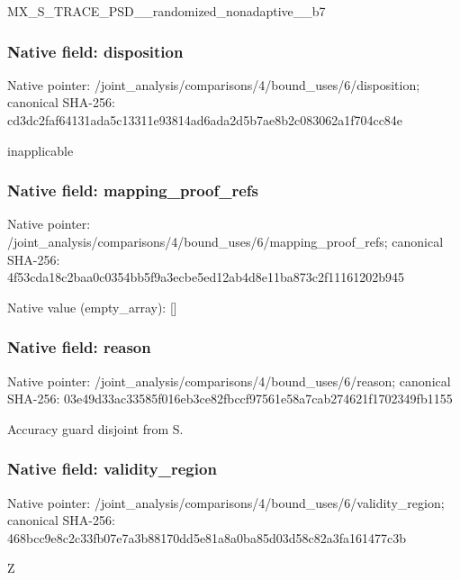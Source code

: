 \documentclass[10pt,a4paper]{article}
\begin{document}
\begingroup\raggedright\sloppy MX\_\allowbreak{}S\_\allowbreak{}TRACE\_\allowbreak{}PSD\_\allowbreak{}\_\allowbreak{}randomized\_\allowbreak{}nonadaptive\_\allowbreak{}\_\allowbreak{}b7\par\endgroup

\subsubsection{Native field: disposition}
Native pointer: /joint\_\allowbreak{}analysis/comparisons/4/bound\_\allowbreak{}uses/6/disposition; canonical SHA-256: cd3dc2faf64131ada5c13311e93814ad6ada2d5b7ae8b2c083062a1f704cc84e

\begingroup\raggedright\sloppy inapplicable\par\endgroup

\subsubsection{Native field: mapping\_\allowbreak{}proof\_\allowbreak{}refs}
Native pointer: /joint\_\allowbreak{}analysis/comparisons/4/bound\_\allowbreak{}uses/6/mapping\_\allowbreak{}proof\_\allowbreak{}refs; canonical SHA-256: 4f53cda18c2baa0c0354bb5f9a3ecbe5ed12ab4d8e11ba873c2f11161202b945

Native value (empty\_\allowbreak{}array): []

\subsubsection{Native field: reason}
Native pointer: /joint\_\allowbreak{}analysis/comparisons/4/bound\_\allowbreak{}uses/6/reason; canonical SHA-256: 03e49d33ac33585f016eb3ce82fbccf97561e58a7cab274621f1702349fb1155

\begingroup\raggedright\sloppy Accuracy guard disjoint from S.\par\endgroup

\subsubsection{Native field: validity\_\allowbreak{}region}
Native pointer: /joint\_\allowbreak{}analysis/comparisons/4/bound\_\allowbreak{}uses/6/validity\_\allowbreak{}region; canonical SHA-256: 468bcc9e8c2c33fb07e7a3b88170dd5e81a8a0ba85d03d58c82a3fa161477c3b

\begingroup\raggedright\sloppy Z\par\endgroup
\end{document}
